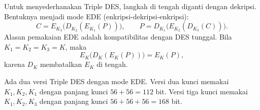 Untuk menyederhanakan Triple DES, langkah di tengah diganti dengan dekripsi.
Bentuknya menjadi mode EDE (enkripsi-dekripsi-enkripsi):
\begin{equation}
C = E_{K_3}\bigl(D_{K_2}(E_{K_1}(P))\bigr),
\qquad P = D_{K_1}\bigl(E_{K_2}(D_{K_3}(C))\bigr).
\label{eq:des-3des-ede}
\end{equation}
Alasan pemakaian EDE adalah kompatibilitas dengan DES tunggal. Bila
$K_1 = K_2 = K_3 = K$, maka
\begin{equation}
E_K\bigl(D_K(E_K(P))\bigr) = E_K(P),
\label{eq:des-3des-kompatibel}
\end{equation}
karena $D_K$ membatalkan $E_K$ di tengah.

Ada dua versi Triple DES dengan mode EDE. Versi dua kunci memakai
$K_1, K_2, K_1$ dengan panjang kunci $56 + 56 = 112$ bit. Versi tiga kunci
memakai $K_1, K_2, K_3$ dengan panjang kunci $56 + 56 + 56 = 168$ bit.
